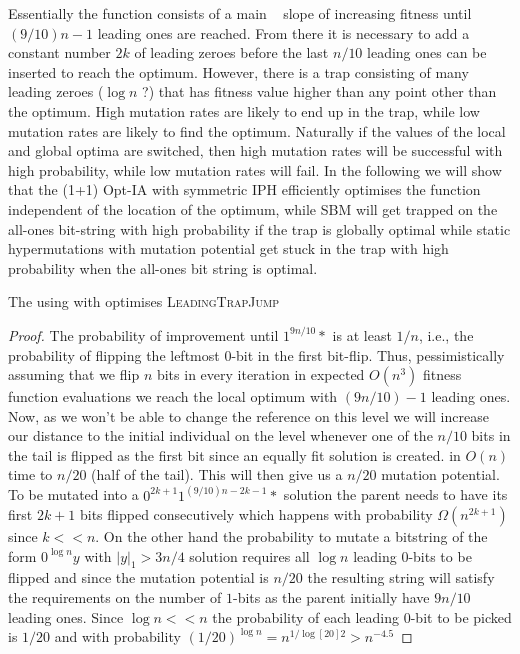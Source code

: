 \documentclass[lettersize,journal]{IEEEtran}
\begin{document}
{ Essentially the function consists of a  main \leadingones~ slope of increasing fitness until $(9/10)n -1$ leading ones are reached. From there it is necessary to add a constant number $2k$ of leading zeroes before the last $n/10$ leading ones can be inserted to reach the optimum. However, there is a trap consisting of many leading zeroes ($\log n$ ?) that has fitness value higher than any point other than the optimum. High mutation rates are likely to end up in the trap, while low mutation rates are likely to find the optimum. Naturally  if the values of the local and global optima are switched, then high mutation rates will be successful with high probability, while low mutation rates will fail. In the following we will show that the (1+1) Opt-IA with symmetric IPH efficiently optimises the function independent of the location of the optimum, while SBM will get trapped on the all-ones bit-string with high probability if the trap is globally optimal while static hypermutations with mutation potential get stuck in the trap with high probability when the all-ones bit string is optimal.
 \begin{theorem}\label{th:linHD-LeadingTrapJump}
 The {\oneoneIA } using \IPHfcm{} with {\linHD } optimises \textsc{LeadingTrapJump} 
 \end{theorem}
 \begin{proof}
 
 
 The probability of improvement until $1^{9n/10}*$ is at least $1/n$, i.e., the probability of flipping the leftmost $0$-bit in the first bit-flip. Thus, pessimistically assuming that we flip $n$ bits in every iteration in expected $O(n^3)$ fitness function evaluations we reach the local optimum with $(9n/10)-1$ leading ones. Now, as we won't be able to change the reference on this level we will increase our distance to the initial individual on the level whenever one of the $n/10$ bits in the tail is flipped as the first bit since an equally fit solution is created. in $O(n)$ time to $n/20$ (half of the tail). This will then give us a $n/20$ mutation potential. To be mutated into a $0^{2k+1}1^{(9/10)n-2k-1}*$ solution the parent needs to have its first $2k+1$ bits flipped consecutively which happens with probability $\Omega(n^{2k+1})$ since $k<<n$. On the other hand the probability to mutate a bitstring of the form $0^{\log n}y$ with $|y|_1>3n/4$ solution requires all $\log n$ leading $0$-bits to be flipped and since the mutation potential is $n/20$ the resulting string will satisfy the requirements on the number of $1$-bits as the parent initially have $9n/10$ leading ones. Since $\log n<< n$ the probability of each leading $0$-bit to be picked is $1/20$ and with probability $(1/20)^{\log n} = n ^{1/\log[20]2}> n^{-4.5}$
	 	

\end{proof}}
\end{document}

